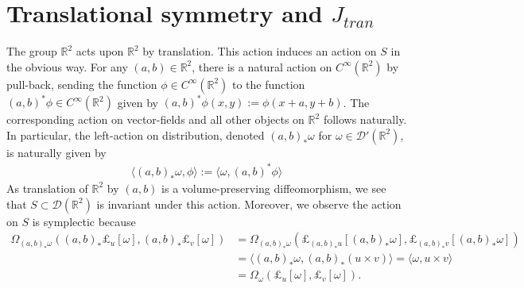 \documentclass[12pt]{amsart}
\begin{document}
\section{Translational symmetry and $J_{tran}$}
The group $\mathbb{R}^2$ acts upon $\mathbb{R}^2$ by translation.
This action induces an action on $S$ in the obvious way.  For any $(a,b) \in \mathbb{R}^2$, there is a natural action on $C^{\infty}(\mathbb{R}^2)$ by pull-back, sending the function $\phi \in C^{\infty}(\mathbb{R}^2)$ to the function $(a,b)^*\phi \in C^{\infty}(\mathbb{R}^2)$ given by $(a,b)^*\phi(x,y) := \phi(x +a,y+b)$.  The corresponding action on vector-fields and all other objects on $\mathbb{R}^2$ follows naturally.  
 In particular, the left-action on distribution, denoted $(a,b)_* \omega$ for $\omega \in \mathcal{D}'(\mathbb{R}^2)$, is naturally given by
\begin{align*}
  \langle (a,b)_* \omega , \phi \rangle := \langle \omega , (a,b)^* \phi \rangle
\end{align*}
As translation of $\mathbb{R}^2$ by $(a,b)$ is a volume-preserving diffeomorphism, we see that $S \subset \mathcal{D}(\mathbb{R}^2)$ is invariant under this action.  Moreover, we observe the action on $S$ is symplectic because
\begin{align*}
  \Omega_{(a,b)_* \omega}( (a,b)_*\pounds_{u}[ \omega] , (a,b)_*\pounds_v[\omega] ) &= \Omega_{(a,b)_* \omega} ( \pounds_{(a,b)_*u}[ (a,b)_*\omega] ,
  \pounds_{(a,b)_*v}[(a,b)_*\omega] ) \\
  &= \langle (a,b)_* \omega , (a,b)_*(u \times v) \rangle = \langle \omega, u \times v \rangle \\
  &= \Omega_{\omega}( \pounds_u[\omega], \pounds_v[\omega]).
\end{align*}
\end{document}
